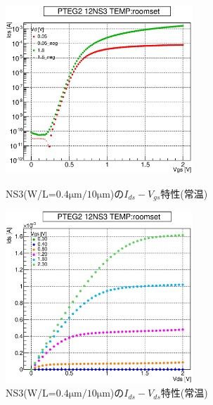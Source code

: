 				\begin{figure}[htbp]
					\begin{minipage}{0.5\hsize}
						\begin{center}
							\includegraphics[width=70mm]{./Chapter/Appendix/Picture/NST/NS3/PTEG2_12_NS3_IdVg_roomset.eps}
						\end{center}
						\caption{NS3(W/L=$0.4\mathrm{\mu m}/10\mathrm{\mu m}$)の$I_{ds}-V_{gs}$特性(常温)}
						\label{fig:NS3_IdVg_room}
					\end{minipage}
					\begin{minipage}{0.5\hsize}
						\begin{center}
							\includegraphics[width=70mm]{./Chapter/Appendix/Picture/NST/NS3/PTEG2_12_NS3_IdVd_roomset.eps}
						\end{center}
						\caption{NS3(W/L=$0.4\mathrm{\mu m}/10\mathrm{\mu m}$)の$I_{ds}-V_{ds}$特性(常温)}
						\label{fig:NS3_IdVd_room}
					\end{minipage}
				\end{figure}
